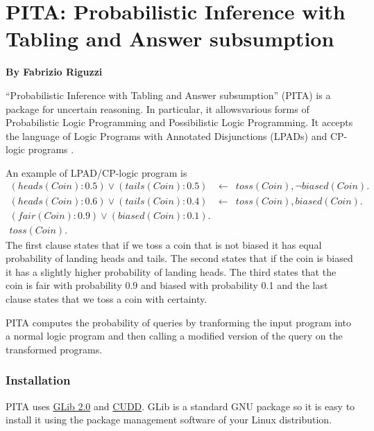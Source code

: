 \chapter{ PITA: Probabilistic  Inference with Tabling and Answer subsumption }
\label{package:pita} 

  \begin{center}
    {\Large {\bf By Fabrizio Riguzzi}}
  \end{center}


%



``Probabilistic  Inference with Tabling and Answer subsumption'' (PITA) \cite{RigSwi10-ICLP10-IC} is a package for uncertain reasoning. In particular, it allowsvarious forms of Probabilistic Logic Programming and Possibilistic Logic Programming. It accepts the language of Logic Programs with Annotated Disjunctions (LPADs)\cite{VenVer03-TR,VenVer04-ICLP04-IC} and CP-logic programs \cite{VenDenBru-JELIA06,DBLP:journals/tplp/VennekensDB09}.

An example of LPAD/CP-logic program is 
\begin{eqnarray*}
(heads(Coin):0.5)\vee (tails(Coin):0.5)&\leftarrow&
toss(Coin),\neg biased(Coin).\\
(heads(Coin):0.6)\vee (tails(Coin):0.4)&\leftarrow&
toss(Coin), biased(Coin).\\
(fair(Coin):0.9) \vee (biased(Coin):0.1).&&\\
toss(Coin).&&
\end{eqnarray*}
The first clause states that if we toss a coin that is not biased it has equal probability of landing heads and tails. The second states that if the coin is biased it has a slightly higher probability of landing heads. The third states that the coin is fair with probability 0.9 and biased with probability 0.1 and the last clause states that we toss a coin with certainty.

PITA computes the probability of queries by tranforming the input program into a normal logic program and then calling a modified version of the query on the transformed programs.

\subsection{Installation}
PITA uses \href{http://www.gtk.org/}{GLib 2.0} and  \href{http://vlsi.colorado.edu/~fabio/CUDD/}{CUDD}.
GLib is a standard GNU package 
so it is easy to install it using the package management software of your Linux 
distribution.

